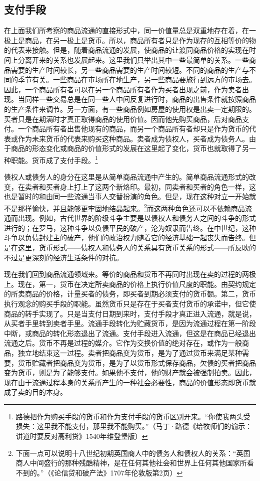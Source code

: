 \documentclass{ctexbook}
\begin{document}
        \subsection{支付手段}

        在上面我们所考察的商品流通的直接形式中，同一价值量总是双重地存在着，在一极上是商品，在另一极上是货币。所以，商品所有者只是作为现存的互相等价的物的代表来接触。但是，随着商品流通的发展，使商品的让渡同商品价格的实现在时间上分离开来的关系也发展起来。这里我们只举出其中一些最简单的关系。一些商品需要的生产时间较长，另一些商品需要的生产时间较短。不同的商品的生产与不同的季节有关。一些商品在市场所在地生产，另一些商品要旅行到远方的市场去。因此，一个商品所有者可以在另一个商品所有者作为买者出现之前，作为卖者出现。当同样一些交易总是在同一些人中间反复进行时，商品的出售条件就按照商品的生产条件来调节。另一方面，有一些商品例如房屋的使用权是出卖一定期限的。买者只是在期满时才真正取得商品的使用价值。因而他先购买商品，后对商品支付。一个商品所有者出售他现有的商品，而另一个商品所有者却只是作为货币的代表或作为未来货币的代表来购买这种商品。卖者成为债权人，买者成为债务人。由于商品的形态变化或商品的价值形式的发展在这里起了变化，货币也就取得了另一种职能。货币成了支付手段。\footnote{路德把作为购买手段的货币和作为支付手段的货币区别开来。“你使我两头受损失：这里我不能支付，那里我不能购买。”（马丁·路德《给牧师们的谕示：讲道时要反对高利贷》1540年维登堡版）}

        债权人或债务人的身分在这里是从简单商品流通中产生的。简单商品流通形式的改变，在卖者和买者身上打上了这两个新烙印。最初，同卖者和买者的角色一样，这也是暂时的和由同一些流通当事人交替扮演的角色。但是，现在这种对立一开始就不是那样愉快，并且能够更牢固地结晶起来。\footnote{下面一点可以说明十八世纪初期英国商人中的债务人和债权人的关系：“英国商人中间盛行的那种残酷精神，是在任何其他社会和世界上任何其他国家所看不到的。”（《论信贷和破产法》1707年伦敦版第2页）}而这两种角色还可以不依赖商品流通而出现。例如，古代世界的阶级斗争主要是以债权人和债务人之间的斗争的形式进行的；在罗马，这种斗争以负债平民的破产，沦为奴隶而告终。在中世纪，这种斗争以负债封建主的破产，他们的政治权力随着它的经济基础一起丧失而告终。但是在这里，货币形式——债权人和债务人的关系具有货币关系的形式——所反映的不过是更深刻的经济生活条件的对抗。

        现在我们回到商品流通领域来。等价的商品和货币不再同时出现在卖的过程的两极上。现在，第一，货币在决定所卖商品的价格上执行价值尺度的职能。由契约规定的所卖商品的价格，计量买者的债务，即买者到期必须支付的货币额。第二，货币执行观念的购买手段的职能。虽然货币只是存在于买者支付货币的承诺中，但它使商品的转手实现了。只是当支付日期到来时，支付手段才真正进入流通，就是说，从买者手里转到卖者手里。流通手段转化为贮藏货币，是因为流通过程在第一阶段中断，或商品的转化形态退出了流通。支付手段进入流通，但这是在商品已经退出流通之后。货币不再是过程的媒介。它作为交换价值的绝对存在，或作为一般商品，独立地结束这一过程。卖者把商品变为货币，是为了通过货币来满足某种需要，货币贮藏者把商品变为货币，是为了以货币形式保存商品，欠债的买者把商品变为货币，则是为了能够支付。如果他不支付，他的财产就会被强制拍卖。因此，现在由于流通过程本身的关系所产生的一种社会必要性，商品的价值形态即货币就成了卖的目的本身。
\end{document}
